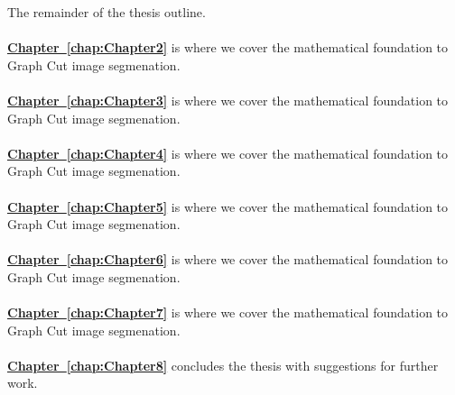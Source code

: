 The remainder of the thesis outline.\\
\\
\textbf{\hyperref[chap:Chapter2]{Chapter~\ref*{chap:Chapter2}}} is where we cover the mathematical foundation to Graph Cut image segmenation.\\
\\
\textbf{\hyperref[chap:Chapter3]{Chapter~\ref*{chap:Chapter3}}} is where we cover the mathematical foundation to Graph Cut image segmenation.\\
\\
\textbf{\hyperref[chap:Chapter4]{Chapter~\ref*{chap:Chapter4}}} is where we cover the mathematical foundation to Graph Cut image segmenation.\\
\\
\textbf{\hyperref[chap:Chapter5]{Chapter~\ref*{chap:Chapter5}}} is where we cover the mathematical foundation to Graph Cut image segmenation.\\
\\
\textbf{\hyperref[chap:Chapter6]{Chapter~\ref*{chap:Chapter6}}} is where we cover the mathematical foundation to Graph Cut image segmenation.\\
\\
\textbf{\hyperref[chap:Chapter7]{Chapter~\ref*{chap:Chapter7}}} is where we cover the mathematical foundation to Graph Cut image segmenation.\\
\\
\textbf{\hyperref[chap:Chapter8]{Chapter~\ref*{chap:Chapter8}}} concludes the thesis with suggestions for further work.
